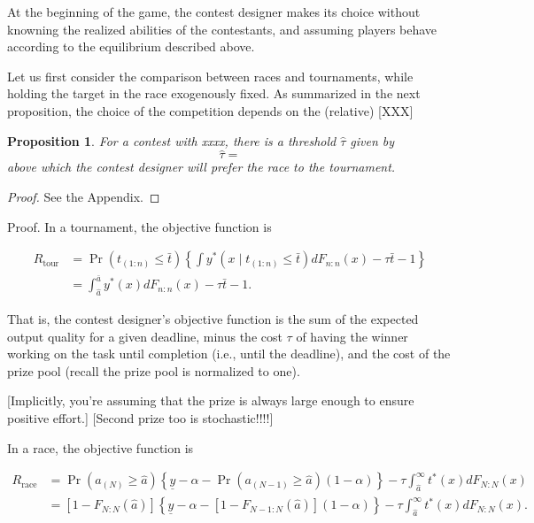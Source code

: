 \documentclass[10pt, titlepage]{article}
\newtheorem{proposition}{Proposition}
\newcommand\deadline{\bar{t}}
\newcommand\target{\underline{y}}
\newcommand\race{\text{race}}
\newcommand\tournament{\text{tour}}
\newcommand\mtype{\hat{a}}
\newcommand\hitype{\bar{a}}
\begin{document}
At the beginning of the game, the contest designer makes its choice
without knowning the realized abilities of the contestants, and assuming
players behave according to the equilibrium described above.

Let us first consider the comparison between races and tournaments,
while holding the target in the race exogenously fixed. As summarized in
the next proposition, the choice of the competition depends on the
(relative) {[}XXX{]}

\begin{proposition}
For a contest with xxxx, there is a threshold $\hat\tau$ given by 
$$
 \hat\tau = 
$$
above which the contest designer will prefer the race to the tournament.
\end{proposition}

\begin{proof}
See the Appendix. 
\end{proof}

Proof. In a tournament, the objective function is

\begin{align}
R_\tournament & = \Pr(t_{(1:n)}\leq \deadline) \left\{\int y^*(x \mid t_{(1:n)}\leq \deadline) dF_{n:n}(x) - \tau \deadline - 1 \right\}  \nonumber\\
  & = \int_{\mtype}^{\hitype} y^*(x) dF_{n:n}(x) - \tau \deadline - 1. 
\end{align}

That is, the contest designer's objective function is the sum of the
expected output quality for a given deadline, minus the cost \(\tau\) of
having the winner working on the task until completion (i.e., until the
deadline), and the cost of the prize pool (recall the prize pool is
normalized to one).

{[}Implicitly, you're assuming that the prize is always large enough to
ensure positive effort.{]} {[}Second prize too is stochastic!!!!{]}

In a race, the objective function is

\begin{align}
R_\race & =  
  \Pr(a_{(N)}\geq \mtype) \left\{\target - \alpha -
  \Pr(a_{(N-1)}\geq \mtype) (1-\alpha) \right\}
  - \tau \int_{\mtype}^{\infty} t^*(x) dF_{N:N}(x) \nonumber\\
  & = [1-F_{N:N}(\mtype)] \left\{\target - \alpha -
  [1-F_{N-1:N}(\mtype)] (1 - \alpha) \right\}
  - \tau \int_{\mtype}^{\infty} t^*(x) dF_{N:N}(x).
\end{align}
\end{document}
